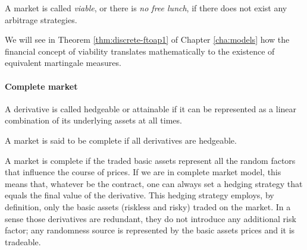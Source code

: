 %


\begin{dfn}
	A market is called \emph{viable}, or there is \emph{no free lunch}, if there does not exist any arbitrage strategies.
\end{dfn}

We will see in Theorem \ref{thm:discrete-ftoap1} of Chapter \ref{cha:models} how the financial concept of viability translates mathematically to the existence of equivalent martingale measures.


\paragraph{Complete market}

\begin{dfn}
	A derivative is called hedgeable or attainable if it can be represented as a linear combination of its underlying assets at all times.
\end{dfn}

\begin{dfn}
	A market is said to be complete if all derivatives are hedgeable.
\end{dfn}

A market is complete if the traded basic assets represent all the random factors that influence the course of prices. If we are in complete market model, this means that, whatever be the contract, one can always set a hedging strategy that equals the final value of the derivative. This hedging
strategy employs, by definition, only the basic assets (riskless and risky) traded on the market. In a sense those derivatives are redundant, they do not introduce any additional risk factor; any randomness source is represented by the basic assets prices and it is tradeable.

